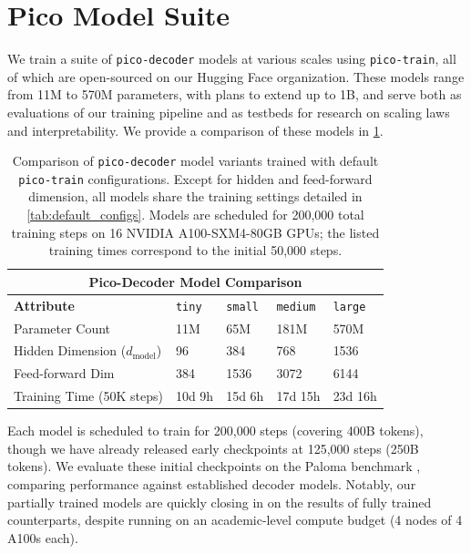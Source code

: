 \section{Pico Model Suite}

We train a suite of \texttt{pico-decoder} models at various scales using \texttt{pico-train}, all of which are open-sourced on our Hugging Face organization. These models range from 11M to 570M parameters, with plans to extend up to 1B, and serve both as evaluations of our training pipeline and as testbeds for research on scaling laws and interpretability. We provide a comparison of these models in \cref{tab:pico-decoder-configs}.

\begin{table}[h!]
    \centering
    \renewcommand{\arraystretch}{1.2}
    \begin{tabular}{|p{}||p{}|p{}|p{}|p{}|}
    \hline
    \multicolumn{5}{|c|}{\textbf{Pico-Decoder Model Comparison}} \\
    \hline
    \textbf{Attribute} & \texttt{tiny} & \texttt{small} & \texttt{medium} & \texttt{large} \\
    \hline
    Parameter Count & 11M & 65M & 181M & 570M \\
    Hidden Dimension ($d_{\text{model}}$) & 96 & 384 & 768 & 1536 \\
    Feed-forward Dim & 384 & 1536 & 3072 & 6144 \\
    Training Time (50K steps) & 10d 9h & 15d 6h & 17d 15h & 23d 16h \\
    \hline
    \end{tabular}
    \vspace{0.5em}
    \caption{Comparison of \texttt{pico-decoder} model variants trained with default \texttt{pico-train} configurations. Except for hidden and feed-forward dimension, all models share the training settings detailed in \cref{tab:default_configs}. Models are scheduled for 200,000 total training steps on 16 NVIDIA A100-SXM4-80GB GPUs; the listed training times correspond to the initial 50,000 steps.}
    \label{tab:pico-decoder-configs}
    \end{table}

Each model is scheduled to train for 200,000 steps (covering 400B tokens), though we have already released early checkpoints at 125,000 steps (250B tokens). We evaluate these initial checkpoints on the Paloma benchmark \citep{magnusson2024paloma}, comparing performance against established decoder models. Notably, our partially trained models are quickly closing in on the results of fully trained counterparts, despite running on an academic-level compute budget (4 nodes of 4 A100s each).

